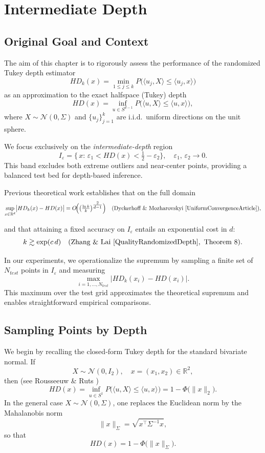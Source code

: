 \documentclass[12pt]{report}
\begin{document}
\chapter{Intermediate Depth}

\section{Original Goal and Context}
The aim of this chapter is to rigorously assess the performance of the randomized Tukey depth estimator
\[
  HD_k(x) = \min_{1\le j\le k} P\bigl(\langle u_j, X\rangle \le \langle u_j, x\rangle\bigr)
\]
as an approximation to the exact halfspace (Tukey) depth
\[
  HD(x) = \inf_{u\in S^{d-1}} P\bigl(\langle u, X\rangle \le \langle u, x\rangle\bigr),
\]
where $X\sim\mathcal N(0,\Sigma)$ and $\{u_j\}_{j=1}^k$ are i.i.d.\ uniform directions on the unit sphere.  

We focus exclusively on the \emph{intermediate-depth} region
\[
  I_{\varepsilon} = \bigl\{\,x:\,\varepsilon_1 < HD(x) < \tfrac12 - \varepsilon_2\bigr\},
  \quad \varepsilon_1,\,\varepsilon_2 \to 0.
\]
This band excludes both extreme outliers and near-center points, providing a balanced test bed for depth-based inference.  

Previous theoretical work establishes that on the full domain
\[
  \sup_{x\in\mathbb R^d} \bigl|HD_k(x) - HD(x)\bigr|
  = O\!\Bigl(\bigl(\tfrac{\ln k}{k}\bigr)^{\tfrac{2}{d-1}}\Bigr)
  \quad(\text{Dyckerhoff \& Mozharovskyi \cite{UniformConvergenceArticle}}),
\]

and that attaining a fixed accuracy on $I_{\varepsilon}$ entails an exponential cost in $d$:
\[
  k \gtrsim \exp(c\,d)
  \quad(\text{Zhang \& Lai \cite{QualityRandomizedDepth}},\ \text{Theorem 8}).
\]

In our experiments, we operationalize the supremum by sampling a finite set of $N_{test}$ points in $I_{\varepsilon}$ and measuring
\[
  \max_{i=1,\dots,N_{test}} \bigl|HD_k(x_i) - HD(x_i)\bigr|.
\]
This maximum over the test grid approximates the theoretical supremum and enables straightforward empirical comparisons.

\section{Sampling Points by Depth}
We begin by recalling the closed‐form Tukey depth for the standard bivariate normal.  If 
\[
  X\sim\mathcal N(0,I_2),
  \quad
  x=(x_1,x_2)\in\mathbb R^2,
\]
then (see Rousseeuw \& Ruts \cite{Rousseeuw1999Depth})
\[
  HD(x)
  = \inf_{u\in S^1} P\bigl(\langle u,X\rangle\le \langle u,x\rangle\bigr)
  = 1 - \Phi\!\bigl(\|x\|_2\bigr).
\]
In the general case \(X\sim\mathcal N(0,\Sigma)\), one replaces the Euclidean norm by the Mahalanobis norm
\[
  \|x\|_{\Sigma}
  = \sqrt{x^\top \Sigma^{-1} x},
\]
so that
\[
  HD(x) = 1 - \Phi\!\bigl(\|x\|_{\Sigma}\bigr).
\]
\end{document}

